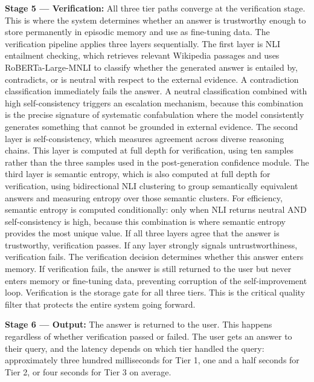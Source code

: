 \documentclass[11pt,a4paper]{article}
\begin{document}
\textbf{Stage 5 — Verification:} All three tier paths converge at the verification stage. This is where the system determines whether an answer is trustworthy enough to store permanently in episodic memory and use as fine-tuning data. The verification pipeline applies three layers sequentially. The first layer is NLI entailment checking, which retrieves relevant Wikipedia passages and uses RoBERTa-Large-MNLI to classify whether the generated answer is entailed by, contradicts, or is neutral with respect to the external evidence. A contradiction classification immediately fails the answer. A neutral classification combined with high self-consistency triggers an escalation mechanism, because this combination is the precise signature of systematic confabulation where the model consistently generates something that cannot be grounded in external evidence. The second layer is self-consistency, which measures agreement across diverse reasoning chains. This layer is computed at full depth for verification, using ten samples rather than the three samples used in the post-generation confidence module. The third layer is semantic entropy, which is also computed at full depth for verification, using bidirectional NLI clustering to group semantically equivalent answers and measuring entropy over those semantic clusters. For efficiency, semantic entropy is computed conditionally: only when NLI returns neutral AND self-consistency is high, because this combination is where semantic entropy provides the most unique value. If all three layers agree that the answer is trustworthy, verification passes. If any layer strongly signals untrustworthiness, verification fails. The verification decision determines whether this answer enters memory. If verification fails, the answer is still returned to the user but never enters memory or fine-tuning data, preventing corruption of the self-improvement loop. Verification is the storage gate for all three tiers. This is the critical quality filter that protects the entire system going forward.

\textbf{Stage 6 — Output:} The answer is returned to the user. This happens regardless of whether verification passed or failed. The user gets an answer to their query, and the latency depends on which tier handled the query: approximately three hundred milliseconds for Tier 1, one and a half seconds for Tier 2, or four seconds for Tier 3 on average.
\end{document}
